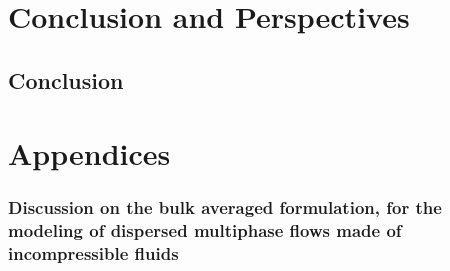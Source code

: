 \documentclass[
    a4paper,                            %
    12pt,                               %
    twoside,                            %
    open=right,                         %
]{My_book}
\begin{document}


\part*{Conclusion and Perspectives}


\chapter*{Conclusion}




\appendix
\renewcommand{\thesection}{\Alph{section}}
\renewcommand{\thesubsection}{\Alph{section}.\arabic{subsection}}
\part*{Appendices}








% 
% 
% 
% 
% 
% 





% 







\section{
Discussion on the bulk averaged formulation, for the modeling of dispersed multiphase flows made of incompressible fluids
}
\label{ap:momentum_formulation}






\end{document}

